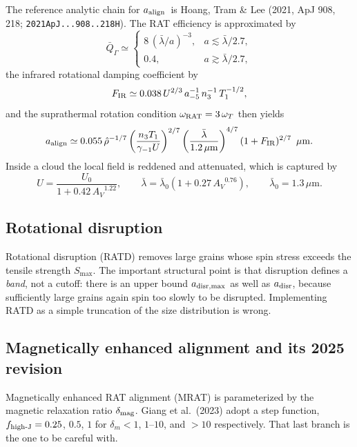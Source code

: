 \documentclass{my_memo}
\newcommand{\code}[1]{\texttt{#1}}
\newcommand{\um}{\ensuremath{\,\mu\mathrm{m}}}
\newcommand{\aalign}{\ensuremath{a_{\rm align}}}
\newcommand{\adisr}{\ensuremath{a_{\rm disr}}}
\newcommand{\fhighJ}{\ensuremath{f_{\rm high\text{-}J}}}
\newcommand{\Av}{\ensuremath{A_V}}
\begin{document}
The reference analytic chain for \aalign\ is Hoang, Tram \& Lee (2021,
ApJ 908, 218; \code{2021ApJ...908..218H}). The RAT efficiency is
approximated by
\begin{equation}
  \bar Q_\Gamma \simeq
  \begin{cases}
    8\,(\bar\lambda/a)^{-3}, & a \lesssim \bar\lambda/2.7, \\
    0.4, & a \gtrsim \bar\lambda/2.7,
  \end{cases}
  \label{eq:qgamma}
\end{equation}
the infrared rotational damping coefficient by
\begin{equation}
  F_{\rm IR} \simeq 0.038\,U^{2/3}\,a_{-5}^{-1}\,n_3^{-1}\,T_1^{-1/2},
  \label{eq:fir}
\end{equation}
and the suprathermal rotation condition $\omega_{\rm RAT} = 3\,\omega_T$
then yields
\begin{equation}
  \aalign \simeq 0.055\,\hat\rho^{-1/7}
  \left(\frac{n_3 T_1}{\gamma_{-1} U}\right)^{2/7}
  \left(\frac{\bar\lambda}{1.2\um}\right)^{4/7}
  (1 + F_{\rm IR})^{2/7}\ \um .
  \label{eq:aalign}
\end{equation}
Inside a cloud the local field is reddened and attenuated, which is
captured by
\begin{equation}
  U = \frac{U_0}{1 + 0.42\,\Av^{1.22}},
  \qquad
  \bar\lambda = \bar\lambda_0\left(1 + 0.27\,\Av^{0.76}\right),
  \qquad
  \bar\lambda_0 = 1.3\um .
  \label{eq:avdep}
\end{equation}

\subsection{Rotational disruption}

Rotational disruption (RATD) removes large grains whose spin stress
exceeds the tensile strength $S_{\max}$. The important structural point
is that disruption defines a \emph{band}, not a cutoff: there is an upper
bound $a_{\rm disr,max}$ as well as \adisr, because sufficiently large
grains again spin too slowly to be disrupted. Implementing RATD as a
simple truncation of the size distribution is wrong.

\subsection{Magnetically enhanced alignment and its 2025 revision}
\label{sec:mrat}

Magnetically enhanced RAT alignment (MRAT) is parameterized by the
magnetic relaxation ratio $\delta_{\rm mag}$. Giang et al.\ (2023) adopt
a step function, $\fhighJ = 0.25$, $0.5$, $1$ for $\delta_m < 1$,
$1$--$10$, and $>10$ respectively. That last branch is the one to be
careful with.
\end{document}
